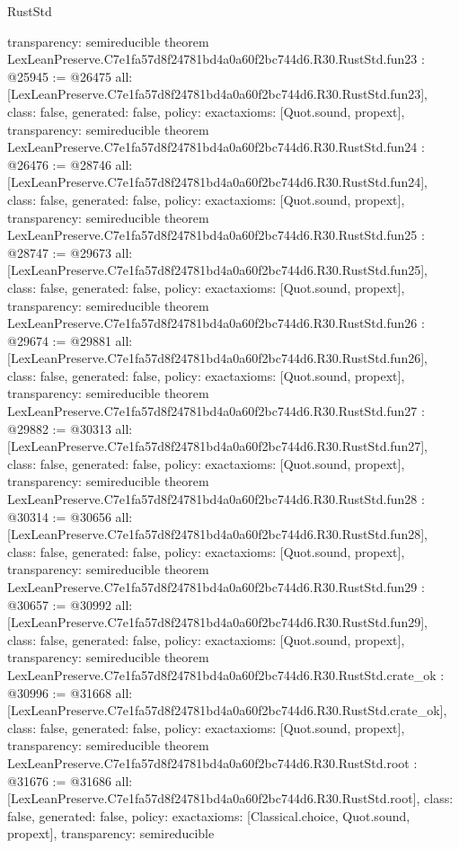 \begin{lexlean}{RustStd}
\begin{coremodule}
{  transparency: semireducible
}
theorem LexLeanPreserve.C7e1fa57d8f24781bd4a0a60f2bc744d6.R30.RustStd.fun23 : @25945 := @26475 {
  all: [LexLeanPreserve.C7e1fa57d8f24781bd4a0a60f2bc744d6.R30.RustStd.fun23],
  class: false,
  generated: false,
  policy: exact{axioms: [Quot.sound, propext]},
  transparency: semireducible
}
theorem LexLeanPreserve.C7e1fa57d8f24781bd4a0a60f2bc744d6.R30.RustStd.fun24 : @26476 := @28746 {
  all: [LexLeanPreserve.C7e1fa57d8f24781bd4a0a60f2bc744d6.R30.RustStd.fun24],
  class: false,
  generated: false,
  policy: exact{axioms: [Quot.sound, propext]},
  transparency: semireducible
}
theorem LexLeanPreserve.C7e1fa57d8f24781bd4a0a60f2bc744d6.R30.RustStd.fun25 : @28747 := @29673 {
  all: [LexLeanPreserve.C7e1fa57d8f24781bd4a0a60f2bc744d6.R30.RustStd.fun25],
  class: false,
  generated: false,
  policy: exact{axioms: [Quot.sound, propext]},
  transparency: semireducible
}
theorem LexLeanPreserve.C7e1fa57d8f24781bd4a0a60f2bc744d6.R30.RustStd.fun26 : @29674 := @29881 {
  all: [LexLeanPreserve.C7e1fa57d8f24781bd4a0a60f2bc744d6.R30.RustStd.fun26],
  class: false,
  generated: false,
  policy: exact{axioms: [Quot.sound, propext]},
  transparency: semireducible
}
theorem LexLeanPreserve.C7e1fa57d8f24781bd4a0a60f2bc744d6.R30.RustStd.fun27 : @29882 := @30313 {
  all: [LexLeanPreserve.C7e1fa57d8f24781bd4a0a60f2bc744d6.R30.RustStd.fun27],
  class: false,
  generated: false,
  policy: exact{axioms: [Quot.sound, propext]},
  transparency: semireducible
}
theorem LexLeanPreserve.C7e1fa57d8f24781bd4a0a60f2bc744d6.R30.RustStd.fun28 : @30314 := @30656 {
  all: [LexLeanPreserve.C7e1fa57d8f24781bd4a0a60f2bc744d6.R30.RustStd.fun28],
  class: false,
  generated: false,
  policy: exact{axioms: [Quot.sound, propext]},
  transparency: semireducible
}
theorem LexLeanPreserve.C7e1fa57d8f24781bd4a0a60f2bc744d6.R30.RustStd.fun29 : @30657 := @30992 {
  all: [LexLeanPreserve.C7e1fa57d8f24781bd4a0a60f2bc744d6.R30.RustStd.fun29],
  class: false,
  generated: false,
  policy: exact{axioms: [Quot.sound, propext]},
  transparency: semireducible
}
theorem LexLeanPreserve.C7e1fa57d8f24781bd4a0a60f2bc744d6.R30.RustStd.crate_ok : @30996 := @31668 {
  all: [LexLeanPreserve.C7e1fa57d8f24781bd4a0a60f2bc744d6.R30.RustStd.crate_ok],
  class: false,
  generated: false,
  policy: exact{axioms: [Quot.sound, propext]},
  transparency: semireducible
}
theorem LexLeanPreserve.C7e1fa57d8f24781bd4a0a60f2bc744d6.R30.RustStd.root : @31676 := @31686 {
  all: [LexLeanPreserve.C7e1fa57d8f24781bd4a0a60f2bc744d6.R30.RustStd.root],
  class: false,
  generated: false,
  policy: exact{axioms: [Classical.choice, Quot.sound, propext]},
  transparency: semireducible
}


\end{coremodule}
\end{lexlean}
